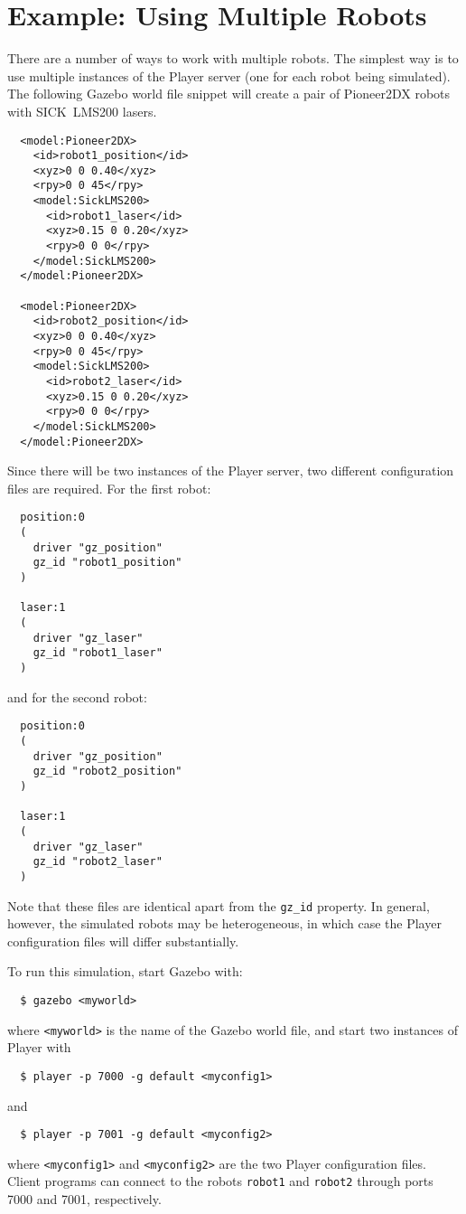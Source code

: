 \section{Example: Using Multiple Robots}

There are a number of ways to work with multiple robots.  The simplest
way is to use multiple instances of the Player server (one for each
robot being simulated).
%
The following Gazebo world file snippet will create a pair of
Pioneer2DX robots with SICK~LMS200 lasers.
\begin{verbatim}
  <model:Pioneer2DX>
    <id>robot1_position</id>
    <xyz>0 0 0.40</xyz>
    <rpy>0 0 45</rpy>
    <model:SickLMS200>
      <id>robot1_laser</id>
      <xyz>0.15 0 0.20</xyz>
      <rpy>0 0 0</rpy>
    </model:SickLMS200>
  </model:Pioneer2DX>

  <model:Pioneer2DX>
    <id>robot2_position</id>
    <xyz>0 0 0.40</xyz>
    <rpy>0 0 45</rpy>
    <model:SickLMS200>
      <id>robot2_laser</id>
      <xyz>0.15 0 0.20</xyz>
      <rpy>0 0 0</rpy>
    </model:SickLMS200>
  </model:Pioneer2DX>
\end{verbatim}
Since there will be two instances of the Player server, two different
configuration files are required.   For the first robot:
\begin{verbatim}
  position:0
  (
    driver "gz_position"
    gz_id "robot1_position"
  )

  laser:1
  (
    driver "gz_laser"
    gz_id "robot1_laser"
  )
\end{verbatim}
and for the second robot:
\begin{verbatim}
  position:0
  (
    driver "gz_position"
    gz_id "robot2_position"
  )

  laser:1
  (
    driver "gz_laser"
    gz_id "robot2_laser"
  )
\end{verbatim}
Note that these files are identical apart from the \verb+gz_id+
property.  In general, however, the simulated robots may be
heterogeneous, in which case the Player configuration files will
differ substantially.

To run this simulation, start Gazebo with:
\begin{verbatim}
  $ gazebo <myworld>
\end{verbatim} %
where \verb+<myworld>+ is the name of the Gazebo world file,
and start two instances of Player with
\begin{verbatim}
  $ player -p 7000 -g default <myconfig1>
\end{verbatim} %
and
\begin{verbatim}
  $ player -p 7001 -g default <myconfig2>
\end{verbatim} %
where \verb+<myconfig1>+ and \verb+<myconfig2>+ are the two Player
configuration files.
%
Client programs can connect to the robots \verb+robot1+ and
\verb+robot2+ through ports 7000 and 7001, respectively.



